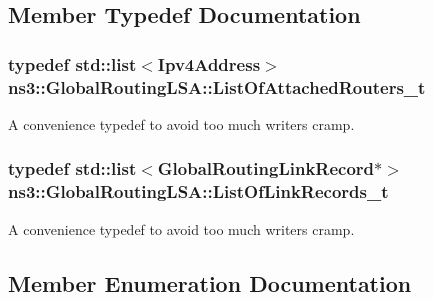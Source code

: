 \subsection{Member Typedef Documentation}
\subsubsection[{\texorpdfstring{List\+Of\+Attached\+Routers\+\_\+t}{ListOfAttachedRouters_t}}]{\setlength{\rightskip}{0pt plus 5cm}typedef {\bf std\+::list}$<${\bf Ipv4\+Address}$>$ {\bf ns3\+::\+Global\+Routing\+L\+S\+A\+::\+List\+Of\+Attached\+Routers\+\_\+t}\hspace{0.3cm}{\ttfamily [private]}}\hypertarget{classns3_1_1GlobalRoutingLSA_a1eb32d6aae2322830368720d24a39a65}{}\label{classns3_1_1GlobalRoutingLSA_a1eb32d6aae2322830368720d24a39a65}
A convenience typedef to avoid too much writers cramp. 
\subsubsection[{\texorpdfstring{List\+Of\+Link\+Records\+\_\+t}{ListOfLinkRecords_t}}]{\setlength{\rightskip}{0pt plus 5cm}typedef {\bf std\+::list}$<${\bf Global\+Routing\+Link\+Record}$\ast$$>$ {\bf ns3\+::\+Global\+Routing\+L\+S\+A\+::\+List\+Of\+Link\+Records\+\_\+t}\hspace{0.3cm}{\ttfamily [private]}}\hypertarget{classns3_1_1GlobalRoutingLSA_a8bbba2d0ab5355f5f3e211c3137e9183}{}\label{classns3_1_1GlobalRoutingLSA_a8bbba2d0ab5355f5f3e211c3137e9183}
A convenience typedef to avoid too much writers cramp. 

\subsection{Member Enumeration Documentation}
